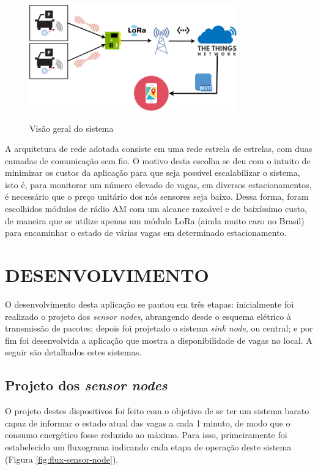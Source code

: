 \documentclass[oneside,openright,12pt]{ufsm_2015} %
\begin{document}
    \begin{figure}[ht]
     	   \caption{\label{exepretex} Visão geral do sistema}
            \centering
            \includegraphics[width=0.8\textwidth]{figuras/funcionamento.png}
            \vspace{\baselineskip} %
                \label{fig:visao-geral}
    \end{figure}
    
    A arquitetura de rede adotada consiste em uma rede estrela de estrelas, com duas camadas de comunicação sem fio. O motivo desta escolha se deu com o intuito de minimizar os custos da aplicação para que seja possível escalabilizar o sistema, isto é, para monitorar um número elevado de vagas, em diversos estacionamentos, é necessário que o preço unitário dos nós sensores seja baixo. Dessa forma, foram escolhidos módulos de rádio AM com um alcance razoável e de baixíssimo custo, de maneira que se utilize apenas um módulo LoRa (ainda muito caro no Brasil) para encaminhar o estado de várias vagas em determinado estacionamento. 
    
    
    
    \section{DESENVOLVIMENTO}
    O desenvolvimento desta aplicação se pautou em três etapas: inicialmente foi realizado o projeto dos \textit{sensor nodes}, abrangendo desde o esquema elétrico à transmissão de pacotes; depois foi projetado o sistema \textit{sink node}, ou central; e por fim foi desenvolvida a aplicação que mostra a disponibilidade de vagas no local. A seguir são detalhados estes sistemas.
    
    \subsection{Projeto dos \textit{sensor nodes}}
    O projeto destes dispositivos foi feito com o objetivo de se ter um sistema barato capaz de informar o estado atual das vagas a cada 1 minuto, de modo que o consumo energético fosse reduzido ao máximo. Para isso, primeiramente foi estabelecido um fluxograma indicando cada etapa de operação deste sistema (Figura \ref{fig:flux-sensor-node}).
    
\end{document}

